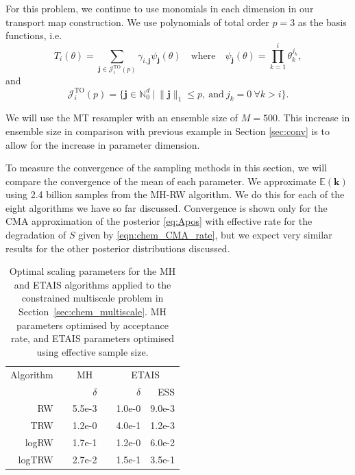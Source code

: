 \documentclass[final]{siamltex}
\begin{document}
For this problem, we continue to use monomials in each dimension in our transport map construction. We use polynomials of total order $p=3$ as the basis functions, i.e.
\[
	T_i(\theta) = \sum_{\mathbf{j}\in\mathcal{J}^{\text{TO}}_i(p)} \gamma_{i,\mathbf{j}}\psi_{\mathbf{j}}(\theta) \quad \text{where} \quad \psi_\mathbf{j}(\theta) = \prod\limits_{k=1}^i \theta_k^{j_k},
\]
and
\[
	\mathcal{J}^{\text{TO}}_i(p) = \{\mathbf{j} \in \mathbb{N}^d_0\ |\ \|\mathbf{j}\|_1 \leq p, \ \text{and}\ j_k = 0\ \forall k > i\}.
\]

We will use the MT\cite{russ2017parallel} resampler with an ensemble size of
$M=500$. This increase in ensemble size in comparison with previous
example in Section \ref{sec:conv} is to allow for the increase in parameter dimension.

To measure the convergence of the sampling methods in this section, we
will compare the convergence of the mean of each parameter. We
approximate $\mathbb{E}(\mathbf{k})$ using 2.4 billion samples from
the MH-RW algorithm. We do this for each of the eight algorithms we
have so far discussed. Convergence is shown only for the CMA
approximation of the posterior \eqref{eq:Apos} with effective rate for
the degradation of $S$ given by \eqref{eqn:chem_CMA_rate}, but we
expect very similar results for the other posterior distributions discussed.

\begin{table}[!h]
\centering
\begin{tabular}{rrrrrr}
\toprule
	\multicolumn{1}{l}{Algorithm} & \multicolumn{3}{c}{MH} & \multicolumn{2}{c}{ETAIS} \\ \cmidrule(lr){2-4} \cmidrule(lr){5-6}
	& & $\delta$ & & $\delta$ & ESS \\ \midrule
	RW & & 5.5e-3 & & 1.0e-0 & 9.0e-3 \\
	TRW & & 1.2e-0 & & 4.0e-1 & 1.2e-3 \\
	logRW & & 1.7e-1 & & 1.2e-0 & 6.0e-2 \\
	logTRW & & 2.7e-2 & & 1.5e-1 & 3.5e-1 \\
\bottomrule
\end{tabular}
\caption{Optimal scaling parameters for the MH and ETAIS algorithms applied to the constrained multiscale problem in Section~\ref{sec:chem_multiscale}. MH parameters optimised by acceptance rate, and ETAIS parameters optimised using effective sample size.}
\label{tab:chem_multiscale_scaling}
\end{table}
\end{document}
